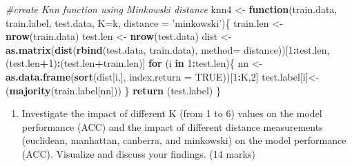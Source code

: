 \documentclass[
]{article}
\newenvironment{Shaded}{\begin{snugshade}}{\end{snugshade}}
\newcommand{\CommentTok}[1]{\textcolor[rgb]{0.56,0.35,0.01}{\textit{#1}}}
\newcommand{\ControlFlowTok}[1]{\textcolor[rgb]{0.13,0.29,0.53}{\textbf{#1}}}
\newcommand{\DataTypeTok}[1]{\textcolor[rgb]{0.13,0.29,0.53}{#1}}
\newcommand{\DecValTok}[1]{\textcolor[rgb]{0.00,0.00,0.81}{#1}}
\newcommand{\KeywordTok}[1]{\textcolor[rgb]{0.13,0.29,0.53}{\textbf{#1}}}
\newcommand{\NormalTok}[1]{#1}
\newcommand{\OperatorTok}[1]{\textcolor[rgb]{0.81,0.36,0.00}{\textbf{#1}}}
\newcommand{\OtherTok}[1]{\textcolor[rgb]{0.56,0.35,0.01}{#1}}
\newcommand{\StringTok}[1]{\textcolor[rgb]{0.31,0.60,0.02}{#1}}
\providecommand{\tightlist}{%
  \setlength{\itemsep}{0pt}\setlength{\parskip}{0pt}}
\begin{document}
\begin{Shaded}
\begin{Highlighting}[]
\CommentTok{#create Knn function using Minkowski distance }
\NormalTok{knn4 <-}\StringTok{ }\ControlFlowTok{function}\NormalTok{(train.data, train.label, test.data, }\DataTypeTok{K=}\NormalTok{k, }\DataTypeTok{distance =} \StringTok{'minkowski'}\NormalTok{)\{}
\NormalTok{    train.len <-}\StringTok{ }\KeywordTok{nrow}\NormalTok{(train.data)}
\NormalTok{    test.len <-}\StringTok{ }\KeywordTok{nrow}\NormalTok{(test.data)}
\NormalTok{    dist <-}\StringTok{ }\KeywordTok{as.matrix}\NormalTok{(}\KeywordTok{dist}\NormalTok{(}\KeywordTok{rbind}\NormalTok{(test.data, train.data), }\DataTypeTok{method=}\NormalTok{ distance))[}\DecValTok{1}\OperatorTok{:}\NormalTok{test.len, (test.len}\OperatorTok{+}\DecValTok{1}\NormalTok{)}\OperatorTok{:}\NormalTok{(test.len}\OperatorTok{+}\NormalTok{train.len)]}
    \ControlFlowTok{for}\NormalTok{ (i }\ControlFlowTok{in} \DecValTok{1}\OperatorTok{:}\NormalTok{test.len)\{}
\NormalTok{        nn <-}\StringTok{ }\KeywordTok{as.data.frame}\NormalTok{(}\KeywordTok{sort}\NormalTok{(dist[i,], }\DataTypeTok{index.return =} \OtherTok{TRUE}\NormalTok{))[}\DecValTok{1}\OperatorTok{:}\NormalTok{K,}\DecValTok{2}\NormalTok{]}
\NormalTok{        test.label[i]<-}\StringTok{ }\NormalTok{(}\KeywordTok{majority}\NormalTok{(train.label[nn]))}
\NormalTok{    \}}
    \KeywordTok{return}\NormalTok{ (test.label)}
\NormalTok{\}}
\end{Highlighting}
\end{Shaded}

\begin{enumerate}
\def\labelenumi{\arabic{enumi}.}
\setcounter{enumi}{2}
\tightlist
\item
  Investigate the impact of different K (from 1 to 6) values on the
  model performance (ACC) and the impact of different distance
  measurements (euclidean, manhattan, canberra, and minkowski) on the
  model performance (ACC). Visualize and discuss your findings. (14
  marks)
\end{enumerate}
\end{document}

